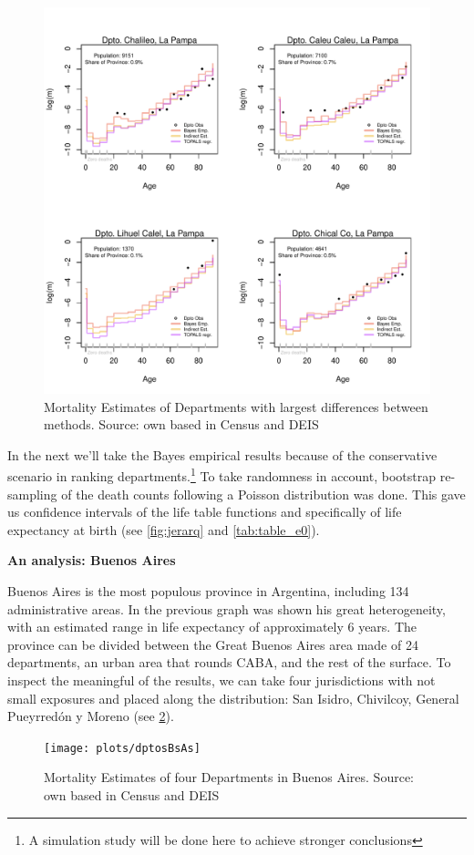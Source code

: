 \documentclass[12pt,]{article}
\begin{document}
\begin{figure}

{\centering \includegraphics[width=0.7\linewidth]{plots/AjusteFeos} 

}

\caption{Mortality Estimates of Departments with largest differences between methods. Source: own based in Census and DEIS}\label{fig:Feos}
\end{figure}

In the next we'll take the Bayes empirical results because of the
conservative scenario in ranking departments.\footnote{A simulation
  study will be done here to achieve stronger conclusions} To take
randomness in account, bootstrap re-sampling of the death counts
following a Poisson distribution was done. This gave us confidence
intervals of the life table functions and specifically of life
expectancy at birth (see \ref{fig:jerarq} and \ref{tab:table_e0}).

\textbf{An analysis: Buenos Aires}

Buenos Aires is the most populous province in Argentina, including 134
administrative areas. In the previous graph was shown his great
heterogeneity, with an estimated range in life expectancy of
approximately 6 years. The province can be divided between the Great
Buenos Aires area made of 24 departments, an urban area that rounds
CABA, and the rest of the surface. To inspect the meaningful of the
results, we can take four jurisdictions with not small exposures and
placed along the distribution: San Isidro, Chivilcoy, General Pueyrredón
y Moreno (see \ref{fig:dptosBsAs}).

\begin{figure}

{\centering \texttt{[image: plots/dptosBsAs]} 

}

\caption{Mortality Estimates of four Departments in Buenos Aires. Source: own based in Census and DEIS}\label{fig:dptosBsAs}
\end{figure}
\end{document}

